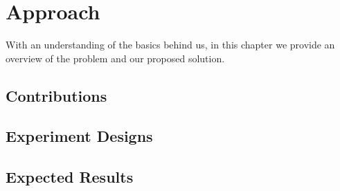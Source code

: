 \chapter{Approach}\label{ch:approach}
With an understanding of the basics behind us, in this chapter we provide an overview of the problem and our proposed solution.

\section{Contributions}


\section{Experiment Designs} \label{experiment_design}

\section{Expected Results}




